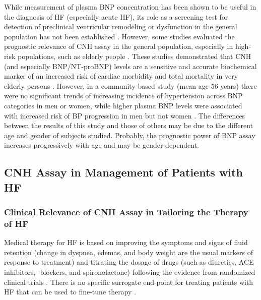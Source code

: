 \documentclass[14pt,a4paper,onecolumn]{extarticle}
\begin{document}
While measurement of plasma BNP concentration has been shown to be useful in the diagnosis of HF (especially acute HF), its role as a screening test for detection of preclinical ventricular remodeling or dysfunction in the general population has not been established \citep{bib35} \citep{bib3246} \citep{bib3247}. However, some studies evaluated the prognostic relevance of CNH assay in the general population, especially in high-risk populations, such as elderly people \citep{bib316} \citep{bib3187} \citep{bib3224} \citep{bib3244} \citep{bib3245} \citep{bib3246} \citep{bib3247} \citep{bib3248}. These studies demonstrated that CNH (and especially BNP/NT-proBNP) levels are a sensitive and accurate biochemical marker of an increased risk of cardiac morbidity and total mortality in very elderly persons \citep{bib316} \citep{bib3147} \citep{bib3188} \citep{bib3227} \citep{bib3248} \citep{bib3249}. However, in a community-based study (mean age 56 years) there were no significant trends of increasing incidence of hypertension across BNP categories in men or women, while higher plasma BNP levels were associated with increased risk of BP progression in men but not women \citep{bib3250}. The differences between the results of this study \citep{bib3250} and those of others \citep{bib316} \citep{bib3185} \citep{bib3227} \citep{bib3248} \citep{bib3249} may be due to the different age and gender of subjects studied. Probably, the prognostic power of BNP assay increases progressively with age and may be gender-dependent.


\subsection{ CNH Assay in Management of Patients with HF}


\subsubsection{ Clinical Relevance of CNH Assay in Tailoring the Therapy of HF}

Medical therapy for HF is based on improving the symptoms and signs of fluid retention (change in dyspnea, edemas, and body weight are the usual markers of response to treatment) and titrating the dosage of drugs (such as diuretics, ACE inhibitors, \beta-blockers, and spironolactone) following the evidence from randomized clinical trials \citep{bib365} \citep{bib368} \citep{bib369} \citep{bib370}. There is no specific surrogate end-point for treating patients with HF that can be used to fine-tune therapy \citep{bib365} \citep{bib368} \citep{bib369} \citep{bib370}.
\end{document}
